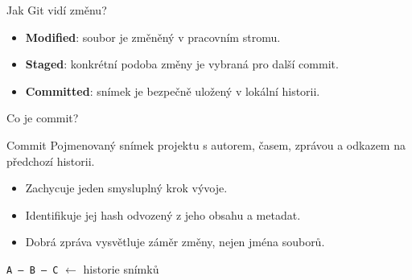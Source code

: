 \documentclass[aspectratio=169]{beamer}
\newcommand{\term}[1]{\textcolor{CodeBlue}{\textbf{#1}}}
\begin{document}
\begin{frame}{Jak Git vidí změnu?}
  \centering
  \vspace{0.8cm}
  \begin{itemize}
    \item \term{Modified}: soubor je změněný v pracovním stromu.
    \item \term{Staged}: konkrétní podoba změny je vybraná pro další commit.
    \item \term{Committed}: snímek je bezpečně uložený v lokální historii.
  \end{itemize}
\end{frame}

\begin{frame}{Co je commit?}
  \begin{block}{Commit}
    Pojmenovaný snímek projektu s autorem, časem, zprávou a odkazem na předchozí historii.
  \end{block}
  \begin{itemize}
    \item Zachycuje jeden smysluplný krok vývoje.
    \item Identifikuje jej hash odvozený z jeho obsahu a metadat.
    \item Dobrá zpráva vysvětluje záměr změny, nejen jména souborů.
  \end{itemize}
  \vspace{0.3cm}
  \centering
  \texttt{A --- B --- C} \hspace{0.4cm} \textcolor{CodeBlue}{$\leftarrow$ historie snímků}
\end{frame}
\end{document}
